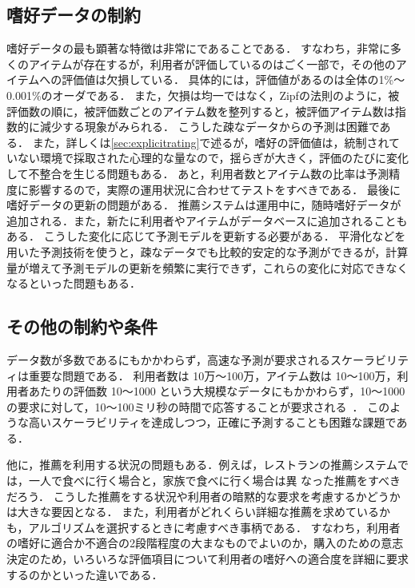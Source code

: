 \subsection{嗜好データの制約}

嗜好データの最も顕著な特徴は非常にであることである．
すなわち，非常に多くのアイテムが存在するが，利用者が評価しているのはごく一部で，その他のアイテムへの評価値は欠損している．
具体的には，評価値があるのは全体の1\%〜0.001\%のオーダである\cite{dmkd:01:01}．
また，欠損は均一ではなく，Zipfの法則\cite{jb:012:00}のように，被評価数の順に，被評価数ごとのアイテム数を整列すると，被評価アイテム数は指数的に減少する現象がみられる\cite{misc:007}．
こうした疎なデータからの予測は困難である．
また，詳しくは\ref{sec:explicitrating}で述るが，嗜好の評価値は，統制されていない環境で採取された心理的な量なので，揺らぎが大きく，評価のたびに変化して不整合を生じる問題もある．
あと，利用者数とアイテム数の比率は予測精度に影響する\cite{jacm:04:01}ので，実際の運用状況に合わせてテストをすべきである．
最後に嗜好データの更新の問題がある．
推薦システムは運用中に，随時嗜好データが追加される．また，新たに利用者やアイテムがデータベースに追加されることもある．
こうした変化に応じて予測モデルを更新する必要がある．
平滑化などを用いた予測技術を使うと，疎なデータでも比較的安定的な予測ができるが，計算量が増えて予測モデルの更新を頻繁に実行できず，これらの変化に対応できなくなるといった問題もある．

\subsection{その他の制約や条件}

データ数が多数であるにもかかわらず，高速な予測が要求されるスケーラビリティは重要な問題である．
利用者数は 10万〜100万，アイテム数は 10〜100万，利用者あたりの評価数 10〜1000 という大規模なデータにもかかわらず，10〜1000の要求に対して，10〜100ミリ秒の時間で応答することが要求される~\cite{dmkd:01:01,ieeem:03:01}．
このような高いスケーラビリティを達成しつつ，正確に予測することも困難な課題である．

他に，推薦を利用する状況の問題もある．例えば，レストランの推薦システムでは，一人で食べに行く場合と，家族で食べに行く場合は異
なった推薦をすべきだろう．
こうした推薦をする状況や利用者の暗黙的な要求を考慮するかどうかは大きな要因となる．
また，利用者がどれくらい詳細な推薦を求めているかも，アルゴリズムを選択するときに考慮すべき事柄である．
すなわち，利用者の嗜好に適合か不適合の2段階程度の大まなものでよいのか，購入のための意志決定のため，いろいろな評価項目について利用者の嗜好への適合度を詳細に要求するのかといった違いである．
